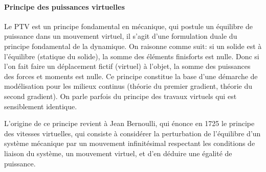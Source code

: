 \medskip
\paragraph{Principe des puissances virtuelles}
Le PTV est un principe fondamental en mécanique, qui postule un équilibre de puissance dans un
mouvement virtuel, il s'agit d'une formulation duale du principe fondamental de la dynamique.
On raisonne comme suit: si un solide est à l'équilibre (statique du solide), la somme des éléments finisforts
est nulle. Donc si l'on fait faire un déplacement fictif (virtuel) à l'objet, la somme des puissances
des forces et moments est nulle.
Ce principe constitue la base d'une démarche de modélisation pour les milieux continus (théorie du
premier gradient, théorie du second gradient).
On parle parfois du principe des travaux virtuels qui est sensiblement identique.



\medskip



\begin{histoire}%
L'origine de ce principe revient à Jean Bernoulli,
qui énonce en 1725 le principe des vitesses
virtuelles, qui consiste à considérer la perturbation de l'équilibre d'un système mécanique
par un mouvement infinitésimal respectant les conditions de liaison du système, un mouvement
virtuel, et d'en déduire une égalité de puissance.

\sbox{\MaBoiteAvecPhotos}{\setlength{\tabcolsep}{0pt}\scriptsize%
\begin{tabular}{ccc}%
\texttt{[image: Bernoulli-Jean]}&
\texttt{[image: dAlembert2]}&
\texttt{[image: Lagrange3]}\\
J. Bernoulli &D'Alembert&Lagrange%
\end{tabular}}
\medskip
{}
\end{histoire}


